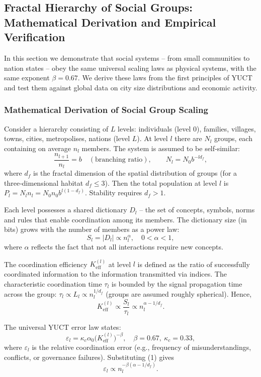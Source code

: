 \documentclass[11pt]{article}
\theoremstyle{remark}
\newcommand{\Keff}{K_{\mathrm{eff}}}
\begin{document}
	\subsection{Fractal Hierarchy of Social Groups: Mathematical Derivation and Empirical Verification}
	\label{sec:social_scaling}
	
	In this section we demonstrate that social systems – from small communities to nation states – obey the same universal scaling laws as physical systems, with the same exponent \(\beta = 0.67\). We derive these laws from the first principles of YUCT and test them against global data on city size distributions and economic activity.
	
	\subsubsection{Mathematical Derivation of Social Group Scaling}
	Consider a hierarchy consisting of \(L\) levels: individuals (level 0), families, villages, towns, cities, metropolises, nations (level \(L\)). At level \(l\) there are \(N_l\) groups, each containing on average \(n_l\) members. The system is assumed to be self‑similar:
	\[
	\frac{n_{l+1}}{n_l} = b \quad (\text{branching ratio}),\qquad
	N_l = N_0 b^{-l d_f},
	\]
	where \(d_f\) is the fractal dimension of the spatial distribution of groups (for a three‑dimensional habitat \(d_f \le 3\)). Then the total population at level \(l\) is \(P_l = N_l n_l = N_0 n_0 b^{l(1-d_f)}\). Stability requires \(d_f > 1\).
	
	Each level possesses a shared dictionary \(D_l\) – the set of concepts, symbols, norms and rules that enable coordination among its members. The dictionary size (in bits) grows with the number of members as a power law:
	\[
	S_l = |D_l| \propto n_l^{\alpha}, \quad 0 < \alpha < 1,
	\]
	where \(\alpha\) reflects the fact that not all interactions require new concepts.
	
	The coordination efficiency \(\Keff^{(l)}\) at level \(l\) is defined as the ratio of successfully coordinated information to the information transmitted via indices. The characteristic coordination time \(\tau_l\) is bounded by the signal propagation time across the group: \(\tau_l \propto L_l \propto n_l^{1/d_f}\) (groups are assumed roughly spherical). Hence,
	\[
	\Keff^{(l)} \propto \frac{S_l}{\tau_l} \propto n_l^{\alpha - 1/d_f}. \tag{1}
	\]
	
	The universal YUCT error law states:
	\[
	\varepsilon_l = \kappa_c \alpha_0 \bigl(\Keff^{(l)}\bigr)^{-\beta}, \quad \beta = 0.67,\ \kappa_c = 0.33,
	\]
	where \(\varepsilon_l\) is the relative coordination error (e.g., frequency of misunderstandings, conflicts, or governance failures). Substituting (1) gives
	\[
	\varepsilon_l \propto n_l^{-\beta(\alpha - 1/d_f)}. \tag{2}
	\]
	
\end{document}
